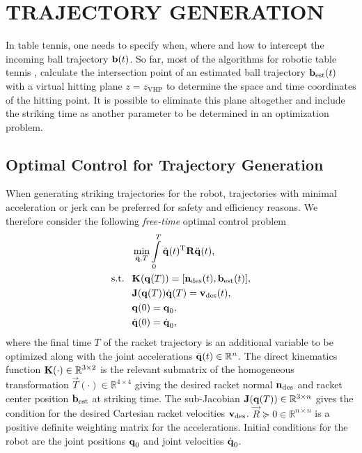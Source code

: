 \section{TRAJECTORY GENERATION}\label{method}
%
In table tennis, one needs to specify when, where and how to intercept the incoming ball trajectory $\boldsymbol{\mathrm{b}}(t)$. So far, most of the algorithms for robotic table tennis \cite{Matsushima05}, \cite{Muelling13} calculate the intersection point of an estimated ball trajectory $\boldsymbol{\mathrm{b}}_{\mathrm{est}}(t)$ with a virtual hitting plane $z = z_{\mathrm{VHP}}$ to determine the space and time coordinates of the hitting point. It is possible to eliminate this plane altogether and include the striking time as another parameter to be determined in an optimization problem.
%
\subsection{Optimal Control for Trajectory Generation}
%
When generating striking trajectories for the robot, trajectories with minimal acceleration or jerk can be preferred for safety and efficiency reasons. We therefore consider the following \emph{free-time} optimal control problem~\cite{Liberzon11}
%
\begin{align}
&\min_{\ddot{\boldsymbol{\mathrm{q}}},T} \int\limits_{0}^{T}\ddot{\boldsymbol{\mathrm{q}}}(t)^{\mathrm{T}}\boldsymbol{\mathrm{R}}\ddot{\boldsymbol{\mathrm{q}}}(t), \label{costFnc1} \\
\textrm{s.t. \ } & \boldsymbol{\mathrm{K}}(\boldsymbol{\mathrm{q}}(T)) = [\boldsymbol{\mathrm{n}}_{\mathrm{des}}(t),\boldsymbol{\mathrm{b}}_{\mathrm{est}}(t)], \label{transCond1}\\
&\boldsymbol{\mathrm{J}}(\boldsymbol{\mathrm{q}}(T))\dot{\boldsymbol{\mathrm{q}}}(T) = \boldsymbol{\mathrm{v}}_{\mathrm{des}}(t), \label{transCond2} \\
&\boldsymbol{\mathrm{q}}(0) = \boldsymbol{\mathrm{q}}_{0}, \label{initCond1} \\
&\dot{\boldsymbol{\mathrm{q}}}(0) = \dot{\boldsymbol{\mathrm{q}}}_{0}, \label{initCond2}
\end{align}
%
\noindent where the final time $T$ of the racket trajectory is an additional variable to be optimized along with the joint accelerations $\ddot{\boldsymbol{\mathrm{q}}}(t) \in \mathbb{R}^{n}$. The direct kinematics function $\boldsymbol{\mathrm{K}}(\cdot)  \in \mathbb{R}^{3 \times 2}$ is the relevant submatrix of the homogeneous transformation $\vec{T}(\cdot) \in \mathbb{R}^{4 \times 4}$ giving the desired racket normal $\boldsymbol{\mathrm{n}}_{\mathrm{des}}$ and racket center position $\boldsymbol{\mathrm{b}}_{\mathrm{est}}$ at striking time. The sub-Jacobian $\boldsymbol{\mathrm{J}}(\boldsymbol{\mathrm{q}}(T)) \in \mathbb{R}^{3 \times n}$ gives the condition for the desired Cartesian racket velocities $\boldsymbol{\mathrm{v}}_{\mathrm{des}}$. $\vec{R} \succeq 0 \in \mathbb{R}^{n \times n}$ is a positive definite weighting matrix for the accelerations. Initial conditions for the robot are the joint positions $\boldsymbol{\mathrm{q}}_0$ and joint velocities $\dot{\boldsymbol{\mathrm{q}}}_0$.

